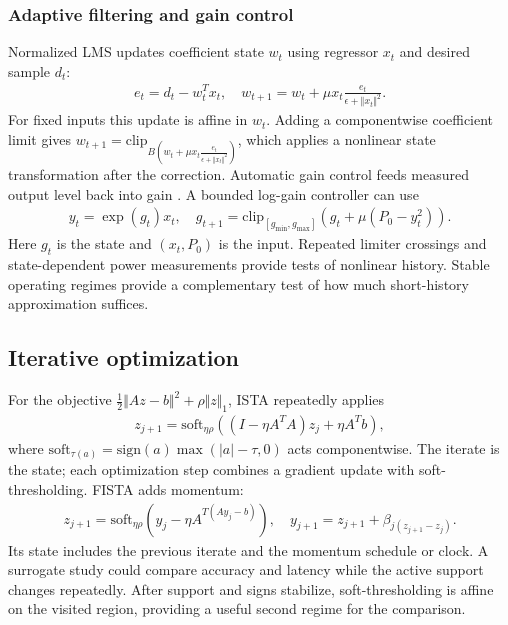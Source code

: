 \documentclass[10pt]{article}
\theoremstyle{canonical}
\theoremstyle{canonicalbullet}
\begin{document}
\subsubsection*{Adaptive filtering and gain control}


Normalized LMS \citep{haykin2002} updates coefficient state ${w }_{t }$ using regressor ${x }_{t }$ and desired sample ${d }_{t }$:
\[\begin{aligned}{e }_{t } =  {d }_{t } -  {w }_{t }^{T } {x }_{t },  \quad  {w }_{t + 1} =  {w }_{t } +  \mu  {x }_{t } \frac{{e }_{t }}{\epsilon  +  {\Vert {x }_{t }\Vert }^{2}}. \end{aligned}\]
 For fixed inputs this update is affine in ${w }_{t }$. Adding a componentwise coefficient limit gives ${w }_{t + 1}= {\text{clip}}_{B ( {w }_{t }+ \mu  {x }_{t } \frac{{e }_{t }}{\epsilon + {\Vert {x }_{t }\Vert }^{2}}) }$, which applies a nonlinear state transformation after the correction. Automatic gain control feeds measured output level back into gain \citep{lyons2011}. A bounded log-gain controller can use
\[\begin{aligned}{y }_{t } =  \operatorname{exp}( {g }_{t })  {x }_{t },  \quad  {g }_{t + 1} =  {\text{clip}}_{[ {g }_{\operatorname{min}}, {g }_{\operatorname{max}}] } ( {g }_{t } +  \mu ( {P }_{0} -  {y }_{t }^{2}) ) . \end{aligned}\]
 Here ${g }_{t }$ is the state and $( {x }_{t }, {P }_{0}) $ is the input. Repeated limiter crossings and state-dependent power measurements provide tests of nonlinear history. Stable operating regimes provide a complementary test of how much short-history approximation suffices.


\subsection*{Iterative optimization}


For the objective $\frac{1}{2} {\Vert A  z - b \Vert }^{2}+ \rho  {\Vert z \Vert }_{1}$, ISTA \citep{daubechies2004} repeatedly applies
\[\begin{aligned}{z }_{j + 1} =  {\text{soft}}_{\eta  \rho } ( ( I  -  \eta  {A }^{T } A )  {z }_{j } +  \eta  {A }^{T } b ) , \end{aligned}\]
 where ${\text{soft}}_{\tau ( a ) }= \text{sign}( a )  \operatorname{max}( | a | - \tau , 0) $ acts componentwise. The iterate is the state; each optimization step combines a gradient update with soft-thresholding. FISTA \citep{beck_teboulle2009} adds momentum:
\[\begin{aligned}{z }_{j + 1} =  {\text{soft}}_{\eta  \rho }( {y }_{j } -  \eta  {A }^{T ( A  {y }_{j }- b ) }) ,  \quad  {y }_{j + 1} =  {z }_{j + 1} +  {\beta }_{j ( {z }_{j + 1}- {z }_{j }) }. \end{aligned}\]
 Its state includes the previous iterate and the momentum schedule or clock. A surrogate study could compare accuracy and latency while the active support changes repeatedly. After support and signs stabilize, soft-thresholding is affine on the visited region, providing a useful second regime for the comparison.
\end{document}
